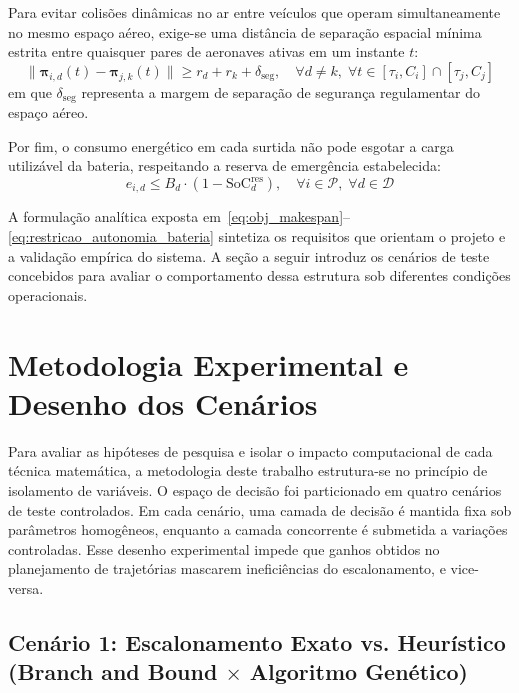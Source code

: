 Para evitar colisões dinâmicas no ar entre veículos que operam simultaneamente no mesmo espaço aéreo, exige-se uma distância de separação espacial mínima estrita entre quaisquer pares de aeronaves ativas em um instante $t$:
\begin{equation}\label{eq:restricao_colisao_dinamica}
\|\boldsymbol{\pi}_{i, d}(t) - \boldsymbol{\pi}_{j, k}(t)\| \ge r_d + r_k + \delta_{\text{seg}}, \quad \forall d \neq k, \; \forall t \in [\tau_i, C_i] \cap [\tau_j, C_j]
\end{equation}
em que $\delta_{\text{seg}}$ representa a margem de separação de segurança regulamentar do espaço aéreo.

Por fim, o consumo energético em cada surtida não pode esgotar a carga utilizável da bateria, respeitando a reserva de emergência estabelecida:
\begin{equation}\label{eq:restricao_autonomia_bateria}
e_{i, d} \le B_d \cdot (1 - \text{SoC}^{\text{res}}_d), \quad \forall i \in \mathcal{P}, \; \forall d \in \mathcal{D}
\end{equation}

A formulação analítica exposta em~\eqref{eq:obj_makespan}--\eqref{eq:restricao_autonomia_bateria} sintetiza os requisitos que orientam o projeto e a validação empírica do sistema. A seção a seguir introduz os cenários de teste concebidos para avaliar o comportamento dessa estrutura sob diferentes condições operacionais.

\section{Metodologia Experimental e Desenho dos Cenários}\label{sec:cenarios_metodologia}

Para avaliar as hipóteses de pesquisa e isolar o impacto computacional de cada técnica matemática, a metodologia deste trabalho estrutura-se no princípio de isolamento de variáveis. O espaço de decisão foi particionado em quatro cenários de teste controlados. Em cada cenário, uma camada de decisão é mantida fixa sob parâmetros homogêneos, enquanto a camada concorrente é submetida a variações controladas. Esse desenho experimental impede que ganhos obtidos no planejamento de trajetórias mascarem ineficiências do escalonamento, e vice-versa.

\subsection{Cenário 1: Escalonamento Exato vs. Heurístico (Branch and Bound $\times$ Algoritmo Genético)}\label{sec:cenario1}

